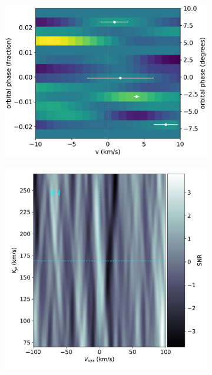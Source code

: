 \documentclass[twocolumn]{aastex631}
\begin{document}
\begin{figure}[ht!]
            \begin{subfigure}[b]{0.333\textwidth}\label{fig:wind-chars-Co-combined}
                \includegraphics[width=\textwidth]{plots-updated/line-velocity/binned/pcolor/points/KELT-20b.Co.phase-binned+RVs.pdf}
            \end{subfigure}

            \begin{subfigure}[b]{0.333\textwidth}\label{fig:2d-ccf-V-combined}
                \includegraphics[width=\textwidth]{plots-updated/kp-vsys-map/blue/KELT-20b.20190504.blue.V.CCFs-shifted.pdf}
            \end{subfigure}


\end{figure}
\end{document}
